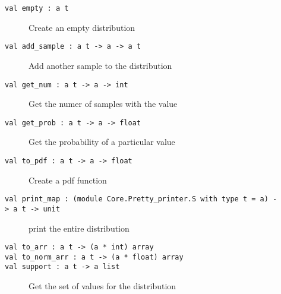 \begin{description}
\item[{\protect\hyperlink{val-empty}{}\texttt{val\ empty\ :\ \textquotesingle{}a\ t}}]
Create an empty distribution
\end{description}

\begin{description}
\item[{\protect\hyperlink{val-addux5fsample}{}\texttt{val\ add\_sample\ :\ \textquotesingle{}a\ t\ -\textgreater{}\ \textquotesingle{}a\ -\textgreater{}\ \textquotesingle{}a\ t}}]
Add another sample to the distribution
\end{description}

\begin{description}
\item[{\protect\hyperlink{val-getux5fnum}{}\texttt{val\ get\_num\ :\ \textquotesingle{}a\ t\ -\textgreater{}\ \textquotesingle{}a\ -\textgreater{}\ int}}]
Get the numer of samples with the value
\end{description}

\begin{description}
\item[{\protect\hyperlink{val-getux5fprob}{}\texttt{val\ get\_prob\ :\ \textquotesingle{}a\ t\ -\textgreater{}\ \textquotesingle{}a\ -\textgreater{}\ float}}]
Get the probability of a particular value
\end{description}

\begin{description}
\item[{\protect\hyperlink{val-toux5fpdf}{}\texttt{val\ to\_pdf\ :\ \textquotesingle{}a\ t\ -\textgreater{}\ \textquotesingle{}a\ -\textgreater{}\ float}}]
Create a pdf function
\end{description}

\begin{description}
\item[{\protect\hyperlink{val-printux5fmap}{}\texttt{val\ print\_map\ :\ (module\ Core.Pretty\_printer.S\ with\ type\ t\ =\ \textquotesingle{}a)\ -\textgreater{}\ \textquotesingle{}a\ t\ -\textgreater{}\ unit}}]
print the entire distribution
\end{description}

\begin{description}
\item[{\protect\hyperlink{val-toux5farr}{}\texttt{val\ to\_arr\ :\ \textquotesingle{}a\ t\ -\textgreater{}\ (\textquotesingle{}a\ *\ int)\ array}\\
\protect\hyperlink{val-toux5fnormux5farr}{}\texttt{val\ to\_norm\_arr\ :\ \textquotesingle{}a\ t\ -\textgreater{}\ (\textquotesingle{}a\ *\ float)\ array}\\
\protect\hyperlink{val-support}{}\texttt{val\ support\ :\ \textquotesingle{}a\ t\ -\textgreater{}\ \textquotesingle{}a\ list}}]
Get the set of values for the distribution
\end{description}

